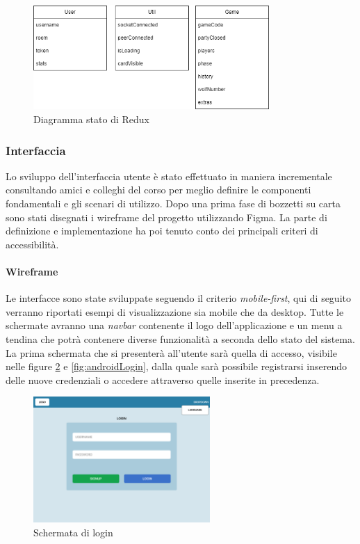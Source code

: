 \begin{figure}[H]
\centering
\includegraphics[width=0.8\textwidth]{img/draw/uml_redux.png}
\caption{Diagramma stato di Redux}
\label{fig:reduxClasses}
\end{figure}


\subsubsection{Interfaccia}
Lo sviluppo dell'interfaccia utente è stato effettuato in maniera incrementale consultando amici e colleghi del corso per meglio definire le componenti fondamentali e gli scenari di utilizzo. Dopo una prima fase di bozzetti su carta sono stati disegnati i wireframe del progetto utilizzando Figma. La parte di definizione e implementazione ha poi tenuto conto dei principali criteri di accessibilità.

\paragraph{Wireframe}
Le interfacce sono state sviluppate seguendo il criterio \emph{mobile-first}, qui di seguito verranno riportati esempi di visualizzazione sia mobile che da desktop. Tutte le schermate avranno una \emph{navbar} contenente il logo dell'applicazione e un menu a tendina che potrà contenere diverse funzionalità a seconda dello stato del sistema.\\[\baselineskip]\indent
La prima schermata che si presenterà all'utente sarà quella di accesso, visibile nelle figure \ref{fig:pcLogin} e \ref{fig:androidLogin}, dalla quale sarà possibile registrarsi inserendo delle nuove credenziali o accedere attraverso quelle inserite in precedenza.

\begin{figure}[H]
\centering
\includegraphics[width=0.6\textwidth]{img/figma/Wireframe-1.png}
\caption{Schermata di login}
\label{fig:pcLogin}
\end{figure}


